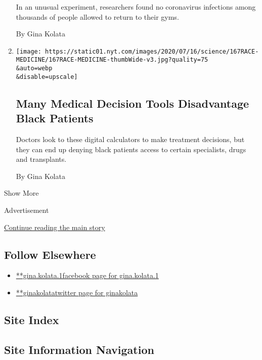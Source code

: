 \begin{enumerate}
  In an unusual experiment, researchers found no coronavirus infections
  among thousands of people allowed to return to their gyms.

  By Gina Kolata
\item
  \href{/2020/06/17/health/many-medical-decision-tools-disadvantage-black-patients.html}{}

  \texttt{[image: https://static01.nyt.com/images/2020/07/16/science/167RACE-MEDICINE/167RACE-MEDICINE-thumbWide-v3.jpg?quality=75\\\&auto=webp\\\&disable=upscale]}

  \hypertarget{many-medical-decision-tools-disadvantage-black-patients}{%
  \subsection{Many Medical Decision Tools Disadvantage Black
  Patients}\label{many-medical-decision-tools-disadvantage-black-patients}}

  Doctors look to these digital calculators to make treatment decisions,
  but they can end up denying black patients access to certain
  specialists, drugs and transplants.

  By Gina Kolata
\end{enumerate}

Show More

Advertisement

\protect\hyperlink{after-mid2}{Continue reading the main story}

\hypertarget{follow-elsewhere}{%
\subsection{Follow Elsewhere}\label{follow-elsewhere}}

\begin{itemize}
\tightlist
\item
  \href{https://www.facebook.com/gina.kolata.1}{**gina.kolata.1facebook
  page for gina.kolata.1}
\item
  \href{https://twitter.com/ginakolata}{**ginakolatatwitter page for
  ginakolata}
\end{itemize}

\hypertarget{site-index}{%
\subsection{Site Index}\label{site-index}}

\hypertarget{site-information-navigation}{%
\subsection{Site Information
Navigation}\label{site-information-navigation}}

